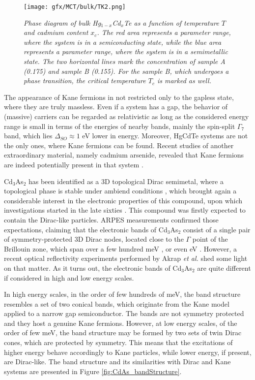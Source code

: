 \documentclass[titlepage,a4paper]{book}
\begin{document}
\begin{figure}[H]
	\centering
	\texttt{[image: gfx/MCT/bulk/TK2.png]}
	\vspace{-10pt}
	\caption{\textit{Phase diagram of bulk Hg$_{1-x}$Cd$_x$Te as a function of temperature $T$ and cadmium content $x_c$. The red area represents a parameter range, where the system is in a semiconducting state, while the blue area represents a parameter range, where the system is in a semimetallic state. The two horizontal lines mark the concentration of sample A (0.175) and sample B (0.155). For the sample B, which undergoes a phase transition, the critical temperature $T_c$ is marked as well.}}
	\label{fig:TK2}
\end{figure} 

The appearance of Kane fermions in not restricted only to the gapless state, where they are truly massless. Even if a system has a gap, the behavior of (massive) carriers can be regarded as relativistic as long as the considered energy range is small in terms of the energies of nearby bands, mainly the spin-split $\Gamma_7$ band, which lies $\Delta_{SO} \approx 1$ eV \cite{Novik_MCT} lower in energy. Moreover, HgCdTe systems are not the only ones, where Kane fermions can be found. Recent studies of another extraordinary material, namely cadmium arsenide, revealed that Kane fermions are indeed potentially present in that system \cite{Akrap_CdAs}.

Cd$_3$As$_2$ has been identified as a 3D topological Dirac semimetal, where a topological phase is stable under ambiend conditions \cite{Liu_CdAs}, which brought again a considerable interest in the electronic properties of this compound, upon which investigations started in the late sixties \cite{Roseman_CdAs}\cite{Bodnar_CdAs}. This compound was firstly expected to contain the Dirac-like particles. ARPES measurements confirmed those expectations, claiming that the electronic bands of Cd$_3$As$_2$ consist of a single pair of symmetry-protected 3D Dirac nodes, located close to the $\Gamma$ point of the Brillouin zone, which span over a few hundred meV \cite{Borisenko_CdAs}\cite{Neupane_CdAs}, or even eV \cite{Liu_CdAs}. However, a recent optical reflectivity experiments performed by Akrap \textit{et al.} \cite{Akrap_CdAs} shed some light on that matter. As it turns out, the electronic bands of Cd$_3$As$_2$ are quite different if considered in high and low energy scales. 

In high energy scales, in the order of few hundreds of meV, the band structure resembles a set of two conical bands, which originate from the Kane model applied to a narrow gap semiconductor. The bands are not symmetry protected and they host a genuine Kane fermions. However, at low energy scales, of the order of few meV, the band structure may be formed by two sets of twin Dirac cones, which are protected by symmetry. This means that the excitations of higher energy behave accordingly to Kane particles, while lower energy, if present, are Dirac-like. The band structure and its similarities with Dirac and Kane systems are presented in Figure \ref{fig:CdAs_bandStructure}. 
\end{document}
